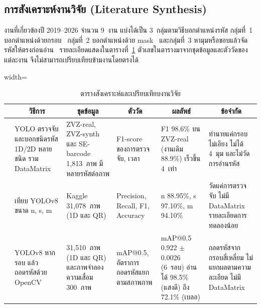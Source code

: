 \documentclass[20pt,a4paper]{article}
\begin{document}
\subsection{การสังเคราะห์งานวิจัย (Literature Synthesis)}

งานที่เกี่ยวข้องปี 2019--2026 จำนวน 9~งาน
แบ่งได้เป็น 3~กลุ่มตามวิธีบอกตำแหน่งรหัส
กลุ่มที่~1 บอกตำแหน่งด้วยกรอบ~\cite{ershova2024yolobarcode,pandya2025yolov8barcode,alsulami2026uav}
กลุ่มที่~2 บอกตำแหน่งด้วย mask~\cite{zharkov2019universal,quenum2021uhr,yuan2019murcnn}
และกลุ่มที่~3 หามุมหรือขอบแล้วจัดรหัสให้ตรงก่อนอ่าน~\cite{rybakova2025datamatrix,liu2024lshaped,corpuz2025qr}
รายละเอียดแสดงในตารางที่~\ref{tab:synthesis_matrix}
ตัวเลขในตารางมาจากชุดข้อมูลและตัววัดของแต่ละงาน จึงไม่สามารถเปรียบเทียบข้ามงานโดยตรงได้

\begin{table}[H]
\centering
\caption{ตารางสังเคราะห์และเปรียบเทียบงานวิจัย}
\label{tab:synthesis_matrix}

\begin{adjustbox}{width=\textwidth}
\footnotesize

\begin{tabular}{|
>{\centering\arraybackslash}p{1.0cm}|
p{2.5cm}|
p{2.5cm}|
p{2.3cm}|
p{2.5cm}|
p{3.0cm}|}
\hline

\multicolumn{1}{|c|}{\textbf{งานวิจัย}} &
\multicolumn{1}{c|}{\textbf{วิธีการ}} &
\multicolumn{1}{c|}{\textbf{ชุดข้อมูล}} &
\multicolumn{1}{c|}{\textbf{ตัววัด}} &
\multicolumn{1}{c|}{\textbf{ผลลัพธ์}} &
\multicolumn{1}{c|}{\textbf{ข้อจำกัด}}
\\
\hline

\cite{ershova2024yolobarcode} &
YOLO ตรวจจับและบอกชนิดรหัส 1D/2D หลายชนิด รวม DataMatrix &
ZVZ-real, ZVZ-synth และ SE-barcode 1,813~ภาพ มีหลายรหัสต่อภาพ &
F1-score ของการตรวจจับ, เวลา &
F1 98.6\% บน ZVZ-real (งานเดิม 88.9\%) เร็วขึ้น 4~เท่า &
ทำนายแค่กรอบไม่เอียง ไม่ได้ 4~มุม และไม่วัดการอ่านรหัส
\\
\hline

\cite{pandya2025yolov8barcode} &
เทียบ YOLOv8 ขนาด n, s, m &
Kaggle 31,078~ภาพ (1D และ QR) &
Precision, Recall, F1, Accuracy &
n 88.95\%, s 97.10\%, m 94.10\% &
วัดแค่การตรวจจับ ไม่มี DataMatrix รายละเอียดการทดลองน้อย
\\
\hline

\cite{alsulami2026uav} &
YOLOv8 หากรอบ แล้วถอดรหัสด้วย OpenCV &
31,510~ภาพ (1D และ QR) และภาพจำลองความเสื่อม 300~ภาพ &
mAP@0.5, อัตราการถอดรหัสแยกตามสภาพภาพ &
mAP@0.5 0.922 $\pm$ 0.0026 (6~รอบ) อ่านได้ 98.5\% (แสงดี) ถึง 72.1\% (เบลอ) &
ถอดรหัสจากกรอบสี่เหลี่ยม ไม่แยกผลตามความละเอียด ไม่มี DataMatrix
\\
\hline


\end{tabular}
\end{adjustbox}
\end{table}
\end{document}
